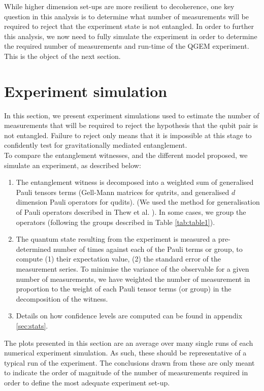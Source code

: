 \documentclass[%
 12pt,
 superscriptaddress,
 amsmath,
 amssymb,
 onecolumn,
 longbibliography
]{revtex4-2}
\begin{document}
\indent While higher dimension set-ups are more resilient to decoherence, one key question in this analysis is to determine what number of measurements will be required to reject that the experiment state is not entangled. In order to further this analysis, we now need to fully simulate the experiment in order to determine the required number of measurements and run-time of the QGEM experiment. This is the object of the next section. 
\section{Experiment simulation\label{sec:expsim}}

\indent In this section, we present experiment simulations used to estimate the number of measurements that will be required to reject the hypothesis that the qubit pair is not entangled. Failure to reject only means that it is impossible at this stage to confidently test for gravitationally mediated entanglement. \\
\indent To compare the entanglement witnesses, and the different model proposed, we simulate an experiment, as described below: 
	\begin{enumerate}
		\item The entanglement witness is decomposed into a weighted sum of generalised Pauli tensors terms (Gell-Mann matrices for qutrits, and generalised $d$ dimension Pauli operators for qudits). (We used the method for generalisation of Pauli operators described in Thew et al. \cite{Thew2002}). In some cases, we group the operators (following the groups described in Table \ref{tab:table1}).
		\item The quantum state resulting from the experiment is measured a pre-determined number of times against each of the Pauli terms or group, to compute (1) their expectation value, (2) the standard error of the measurement series. To minimise the variance of the observable for a given number of measurements, we have weighted the number of measurement in proportion to the weight of each Pauli tensor terms (or group) in the decomposition of the witness.
		\item Details on how confidence levels are computed can be found in appendix \ref{sec:stats}.
	\end{enumerate}
\indent The plots presented in this section are an average over many single runs of each numerical experiment simulation. As such, these should be representative of a typical run of the experiment. The conclusions drawn from these are only meant to indicate the order of magnitude of the number of measurements required in order to define the most adequate experiment set-up. \\
\end{document}
